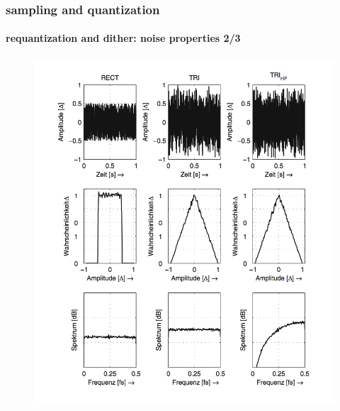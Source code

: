 	\begin{frame}\frametitle{sampling and quantization}\framesubtitle{requantization and dither: noise properties 2/3}
		\vspace{-3mm}
        \begin{figure}[!hbt]
			\centering
				\includegraphics[scale=0.5]{Graph/noiseadv.png}
		\end{figure}
	\end{frame}	
